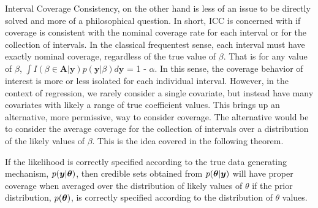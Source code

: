 Interval Coverage Consistency, on the other hand is less of an issue to be directly solved and more of a philosophical question. In short, ICC is concerned with if coverage is consistent with the nominal coverage rate for each interval or for the collection of intervals. In the classical frequentest sense, each interval must have exactly nominal coverage, regardless of the true value of $\beta$. That is for any value of $\beta$, $\int I(\beta \in \boldsymbol{A} | \boldsymbol{y}) p(\boldsymbol{y} | \beta)d\boldsymbol{y}$ = 1 - $\alpha$. In this sense, the coverage behavior of interest is more or less isolated for each individual interval. However, in the context of regression, we rarely consider a single covariate, but instead have many covariates with likely a range of true coefficient values. This brings up an alternative, more permissive, way to consider coverage. The alternative would be to consider the average coverage for the collection of intervals over a distribution of the likely values of $\beta$. This is the idea covered in the following theorem.

\begin{thm}
  \label{Thm:bcc}
  If the likelihood is correctly specified according to the true data generating mechanism, $p(\boldsymbol{y} | \boldsymbol{\theta})$, then credible sets obtained from $p(\boldsymbol{\theta}|\boldsymbol{y})$ will have proper coverage when averaged over the distribution of likely values of $\theta$ if the prior distribution, $p(\boldsymbol{\theta})$, is correctly specified according to the distribution of $\theta$ values.
\end{thm}

